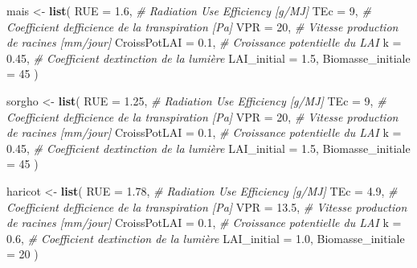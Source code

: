 \documentclass[
]{article}
\newenvironment{Shaded}{\begin{snugshade}}{\end{snugshade}}
\newcommand{\AttributeTok}[1]{\textcolor[rgb]{0.13,0.29,0.53}{#1}}
\newcommand{\CommentTok}[1]{\textcolor[rgb]{0.56,0.35,0.01}{\textit{#1}}}
\newcommand{\DecValTok}[1]{\textcolor[rgb]{0.00,0.00,0.81}{#1}}
\newcommand{\FloatTok}[1]{\textcolor[rgb]{0.00,0.00,0.81}{#1}}
\newcommand{\FunctionTok}[1]{\textcolor[rgb]{0.13,0.29,0.53}{\textbf{#1}}}
\newcommand{\NormalTok}[1]{#1}
\newcommand{\OtherTok}[1]{\textcolor[rgb]{0.56,0.35,0.01}{#1}}
\begin{document}
\begin{Shaded}
\begin{Highlighting}[]
\NormalTok{mais }\OtherTok{\textless{}{-}} \FunctionTok{list}\NormalTok{(}
  \AttributeTok{RUE               =} \FloatTok{1.6}\NormalTok{,   }\CommentTok{\# Radiation Use Efficiency [g/MJ]}
  \AttributeTok{TEc               =} \DecValTok{9}\NormalTok{,     }\CommentTok{\# Coefficient d\textquotesingle{}efficience de la transpiration [Pa]}
  \AttributeTok{VPR               =} \DecValTok{20}\NormalTok{,    }\CommentTok{\# Vitesse production de racines [mm/jour]}
  \AttributeTok{CroissPotLAI      =} \FloatTok{0.1}\NormalTok{,   }\CommentTok{\# Croissance potentielle du LAI }
  \AttributeTok{k                 =} \FloatTok{0.45}\NormalTok{,  }\CommentTok{\# Coefficient d\textquotesingle{}extinction de la lumière}
  \AttributeTok{LAI\_initial       =} \FloatTok{1.5}\NormalTok{,   }
  \AttributeTok{Biomasse\_initiale =} \DecValTok{45}     
\NormalTok{)}

\NormalTok{sorgho }\OtherTok{\textless{}{-}} \FunctionTok{list}\NormalTok{(}
  \AttributeTok{RUE               =} \FloatTok{1.25}\NormalTok{,  }\CommentTok{\# Radiation Use Efficiency [g/MJ]}
  \AttributeTok{TEc               =} \DecValTok{9}\NormalTok{,     }\CommentTok{\# Coefficient d\textquotesingle{}efficience de la transpiration [Pa]}
  \AttributeTok{VPR               =} \DecValTok{20}\NormalTok{,    }\CommentTok{\# Vitesse production de racines [mm/jour]}
  \AttributeTok{CroissPotLAI      =} \FloatTok{0.1}\NormalTok{,   }\CommentTok{\# Croissance potentielle du LAI }
  \AttributeTok{k                 =} \FloatTok{0.45}\NormalTok{,  }\CommentTok{\# Coefficient d\textquotesingle{}extinction de la lumière}
  \AttributeTok{LAI\_initial       =} \FloatTok{1.5}\NormalTok{,   }
  \AttributeTok{Biomasse\_initiale =} \DecValTok{45}     
\NormalTok{)}

\NormalTok{haricot }\OtherTok{\textless{}{-}} \FunctionTok{list}\NormalTok{(}
  \AttributeTok{RUE               =} \FloatTok{1.78}\NormalTok{,  }\CommentTok{\# Radiation Use Efficiency [g/MJ]}
  \AttributeTok{TEc               =} \FloatTok{4.9}\NormalTok{,   }\CommentTok{\# Coefficient d\textquotesingle{}efficience de la transpiration [Pa]}
  \AttributeTok{VPR               =} \FloatTok{13.5}\NormalTok{,  }\CommentTok{\# Vitesse production de racines [mm/jour]}
  \AttributeTok{CroissPotLAI      =} \FloatTok{0.1}\NormalTok{,   }\CommentTok{\# Croissance potentielle du LAI }
  \AttributeTok{k                 =} \FloatTok{0.6}\NormalTok{,   }\CommentTok{\# Coefficient d\textquotesingle{}extinction de la lumière}
  \AttributeTok{LAI\_initial       =} \FloatTok{1.0}\NormalTok{,   }
  \AttributeTok{Biomasse\_initiale =} \DecValTok{20}     
\NormalTok{)}


\end{Highlighting}
\end{Shaded}
\end{document}
